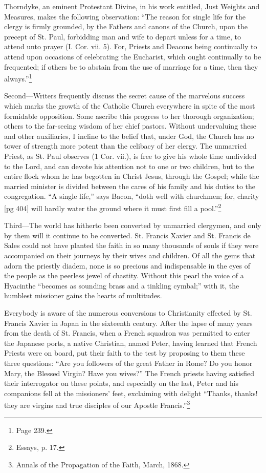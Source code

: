 Thorndyke, an eminent Protestant Divine, in
his work entitled, Just Weights and Measures,
makes the following observation: “The reason for
single life for the clergy is firmly grounded, by the
Fathers and canons of the Church, upon the precept
of St. Paul, forbidding man and wife to depart
unless for a time, to attend unto prayer (I.
Cor. vii. 5). For, Priests and Deacons being continually
to attend upon occasions of celebrating
the Eucharist, which ought continually to be frequented;
if others be to abstain from the use of
marriage for a time, then they always.”\footnote{Page 239.}

Second—Writers frequently discuss the secret
cause of the marvelous success which marks the
growth of the Catholic Church everywhere in spite
of the most formidable opposition. Some ascribe
this progress to her thorough organization; others
to the far-seeing wisdom of her chief pastors.
Without undervaluing these and other auxiliaries,
I incline to the belief that, under God, the Church
has no tower of strength more potent than the
celibacy of her clergy. The unmarried Priest, as
St. Paul observes (1 Cor. vii.), is free to give his
whole time undivided to the Lord, and can devote
his attention not to one or two children, but to the
entire flock whom he has begotten in Christ Jesus,
through the Gospel; while the married minister is
divided between the cares of his family and his
duties to the congregation. “A single life,” says
Bacon, “doth well with churchmen; for, charity
[pg 404]
will hardly water the ground where it must first
fill a pool.”\footnote{Essays, p. 17.}

Third—The world has hitherto been converted
by unmarried clergymen, and only by them will it
continue to be converted. St. Francis Xavier and
St. Francis de Sales could not have planted the
faith in so many thousands of souls if they were
accompanied on their journeys by their wives and
children. Of all the gems that adorn the priestly
diadem, none is so precious and indispensable in
the eyes of the people as the peerless jewel of
chastity. Without this pearl the voice of a Hyacinthe
“becomes as sounding brass and a tinkling
cymbal;” with it, the humblest missioner gains
the hearts of multitudes.

Everybody is aware of the numerous conversions
to Christianity effected by St. Francis
Xavier in Japan in the sixteenth century. After
the lapse of many years from the death of St.
Francis, when a French squadron was permitted
to enter the Japanese ports, a native Christian,
named Peter, having learned that French Priests
were on board, put their faith to the test by proposing
to them these three questions: “Are you
followers of the great Father in Rome? Do you
honor Mary, the Blessed Virgin? Have you
wives?” The French priests having satisfied
their interrogator on these points, and especially
on the last, Peter and his companions fell at the
missioners' feet, exclaiming with delight
“Thanks, thanks! they are virgins and true disciples
of our Apostle Francis.”\footnote{Annals
of the Propagation of the Faith, March, 1868.}

